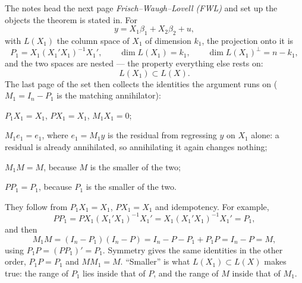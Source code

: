 \documentclass[11pt]{article}
\begin{document}
The notes head the next page \emph{Frisch--Waugh--Lovell (FWL)} and set up the
objects the theorem is stated in. For
\[ y = X_{1}\beta_{1} + X_{2}\beta_{2} + u, \]
with $L(X_{1})$ the column space of $X_{1}$ of dimension $k_{1}$, the projection
onto it is
\[ P_{1} = X_{1}(X_{1}'X_{1})^{-1}X_{1}', \qquad
   \dim L(X_{1}) = k_{1}, \qquad \dim L(X_{1})^{\perp} = n - k_{1}, \]
and the two spaces are nested --- the property everything else rests on:
\[ L(X_{1}) \subset L(X). \]
The last page of the set then collects the identities the argument runs on
($M_{1} = I_{n} - P_{1}$ is the matching annihilator):
\begin{flatlist}
  \item $P_{1}X_{1} = X_{1}$, \quad $PX_{1} = X_{1}$, \quad $M_{1}X_{1} = 0$;
  \item $M_{1}e_{1} = e_{1}$, where $e_{1} = M_{1}y$ is the residual from regressing
        $y$ on $X_{1}$ alone: a residual is already annihilated, so annihilating it
        again changes nothing;
  \item $M_{1}M = M$, because $M$ is the smaller of the two;
  \item $PP_{1} = P_{1}$, because $P_{1}$ is the smaller of the two.
\end{flatlist}
They follow from $P_{1}X_{1} = X_{1}$, $PX_{1} = X_{1}$ and idempotency. For example,
\[ PP_{1} = PX_{1}(X_{1}'X_{1})^{-1}X_{1}' = X_{1}(X_{1}'X_{1})^{-1}X_{1}' = P_{1}, \]
and then
\[ M_{1}M = (I_{n}-P_{1})(I_{n}-P) = I_{n} - P - P_{1} + P_{1}P = I_{n} - P = M, \]
using $P_{1}P = (PP_{1})' = P_{1}$. Symmetry gives the same identities in the other
order, $P_{1}P = P_{1}$ and $MM_{1} = M$.
``Smaller'' is what $L(X_{1}) \subset L(X)$ makes true: the range of $P_{1}$ lies
inside that of $P$, and the range of $M$ inside that of $M_{1}$.
\end{document}
